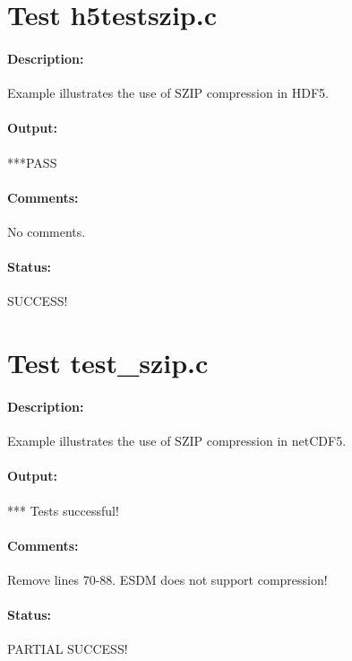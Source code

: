 \section{Test h5testszip.c}

\paragraph{Description:} Example illustrates the use of SZIP compression in HDF5.

\paragraph{Output:} ***PASS

\paragraph{Comments:} No comments.

\paragraph{Status:} SUCCESS!

\section{Test test\_szip.c}

\paragraph{Description:} Example illustrates the use of SZIP compression in netCDF5.

\paragraph{Output:} *** Tests successful!

\paragraph{Comments:} Remove lines 70-88. ESDM does not support compression!

\paragraph{Status:} PARTIAL SUCCESS!

\section{}

